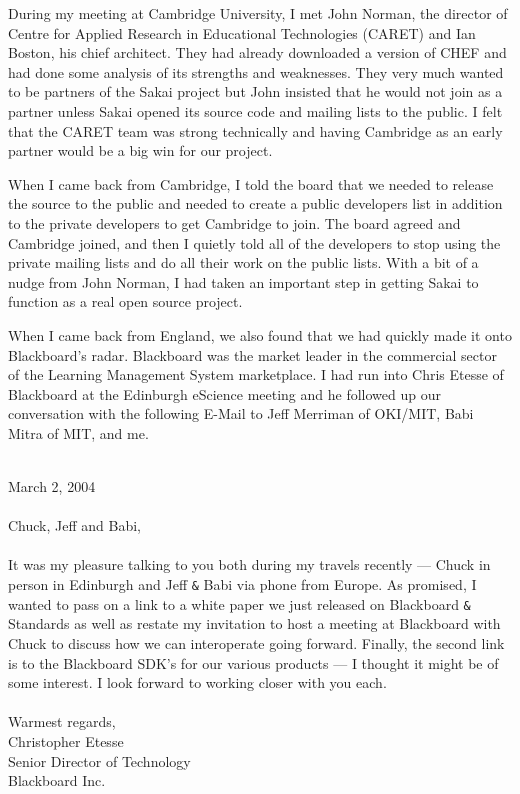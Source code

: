 \documentclass[12pt]{book}
\begin{document}
During my meeting at Cambridge University, I met John Norman,
the director of Centre for Applied Research in Educational Technologies (CARET)
and Ian Boston, his chief architect.  They had already downloaded
a version of CHEF and had done some analysis of its strengths and weaknesses.  They very
much wanted to be partners of the Sakai project but John insisted that he would
not join as a partner unless Sakai opened its source code and mailing lists
to the public. I felt that the CARET team was strong technically and having
Cambridge as an early partner would be a big win for our project.

When I came back from Cambridge, I told the board that we needed to
release the source to the public and needed to create a public developers
list in addition to the private developers to get Cambridge to join.
The board agreed and Cambridge joined, and then I quietly told all of the
developers to stop using the private mailing lists and do all their work
on the public lists.  With a bit of a nudge from John Norman,
I had taken an important step in getting Sakai to function as a
real open source project.

When I came back from England, we also found that we had quickly
made it onto Blackboard's radar.  Blackboard was the market leader
in the commercial sector of the Learning Management System
marketplace.   I had run into Chris Etesse of Blackboard at the
Edinburgh eScience meeting and he followed up our conversation with
the following E-Mail to Jeff Merriman of OKI\slash MIT, Babi
Mitra of MIT, and me.\\
\\
\begin{sf}
March 2, 2004\\
\\
Chuck, Jeff and Babi,\\
\\
It was my pleasure talking to you both during my travels
recently --- Chuck in person in Edinburgh and Jeff \verb"&" Babi
via phone from Europe. As promised, I wanted to pass on
a link to a white paper we just released on Blackboard
\verb"&" Standards as well as restate my invitation to host a
meeting at Blackboard with Chuck to discuss how we can
interoperate going forward.  Finally, the second link
is to the Blackboard SDK's for our various products ---
I thought it might be of some interest. I look forward
to working closer with you each.\\
\\
Warmest regards,
\\
Christopher Etesse \\
Senior Director of Technology\\
Blackboard Inc. \\
\end{sf}
%
\end{document}
